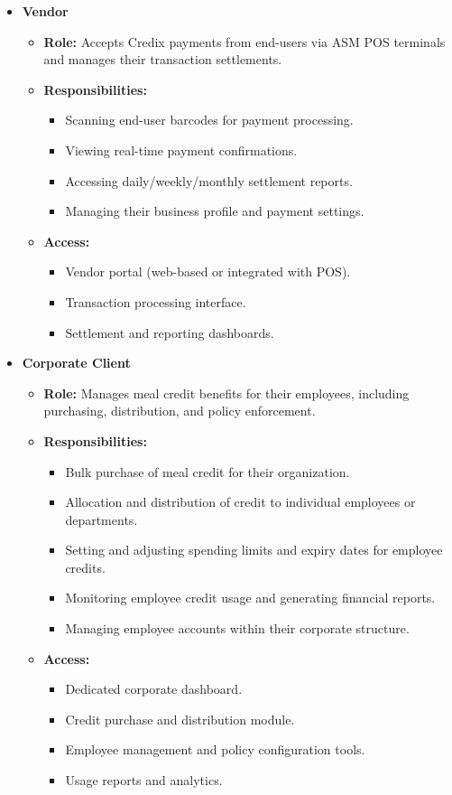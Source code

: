 \begin{itemize}
    \item \textbf{Vendor}
    \begin{itemize}
        \item \textbf{Role:} Accepts Credix payments from end-users via ASM POS terminals and manages their transaction settlements.
        \item \textbf{Responsibilities:}
        \begin{itemize}
            \item Scanning end-user barcodes for payment processing.
            \item Viewing real-time payment confirmations.
            \item Accessing daily/weekly/monthly settlement reports.
            \item Managing their business profile and payment settings.
        \end{itemize}
        \item \textbf{Access:}
        \begin{itemize}
            \item Vendor portal (web-based or integrated with POS).
            \item Transaction processing interface.
            \item Settlement and reporting dashboards.
        \end{itemize}
    \end{itemize}

    \item \textbf{Corporate Client}
    \begin{itemize}
        \item \textbf{Role:} Manages meal credit benefits for their employees, including purchasing, distribution, and policy enforcement.
        \item \textbf{Responsibilities:}
        \begin{itemize}
            \item Bulk purchase of meal credit for their organization.
            \item Allocation and distribution of credit to individual employees or departments.
            \item Setting and adjusting spending limits and expiry dates for employee credits.
            \item Monitoring employee credit usage and generating financial reports.
            \item Managing employee accounts within their corporate structure.
        \end{itemize}
        \item \textbf{Access:}
        \begin{itemize}
            \item Dedicated corporate dashboard.
            \item Credit purchase and distribution module.
            \item Employee management and policy configuration tools.
            \item Usage reports and analytics.
        \end{itemize}
    \end{itemize}


\end{itemize}
